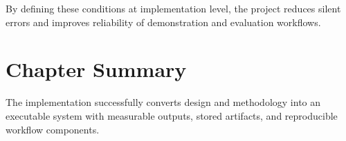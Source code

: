 By defining these conditions at implementation level, the project reduces silent errors and improves reliability of demonstration and evaluation workflows.

\section{Chapter Summary}
The implementation successfully converts design and methodology into an executable system with measurable outputs, stored artifacts, and reproducible workflow components.
